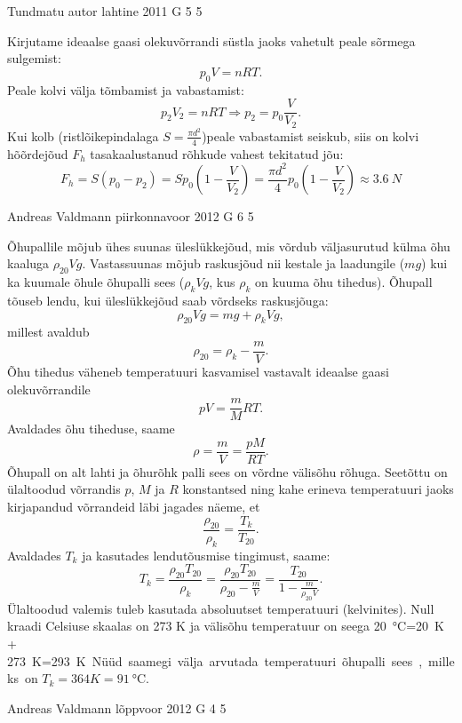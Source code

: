 \documentclass[11pt]{article}
\begin{document}
{%
{Tundmatu autor} %
{lahtine} %
{2011} %
{G 5} %
{5} %
{

\ifSolution
Kirjutame ideaalse gaasi olekuvõrrandi süstla jaoks vahetult peale sõrmega sulgemist:
\[p_{0}V=nRT.\]
Peale kolvi välja tõmbamist ja vabastamist:
\[p_{2}V_{2}=nRT \Rightarrow p_{2}=p_{0}\frac{V}{V_{2}}. \]
Kui kolb (ristlõikepindalaga $S=\frac{\pi d^{2}}{4}$)peale vabastamist seiskub, siis on kolvi hõõrdejõud $F_{h}$ tasakaalustanud rõhkude vahest tekitatud jõu:
\[F_{h}=S(p_{0}-p_{2})=Sp_{0} \left(1-\frac{V}{V_{2}}\right)=\frac{\pi
	d^{2}}{4}p_{0} \left(1-\frac{V}{V_{2}}\right) \approx \SI{3,6}{N} \]
\fi
}

{Andreas Valdmann} %
{piirkonnavoor} %
{2012} %
{G 6} %
{5} %
{

\ifSolution
Õhupallile mõjub ühes suunas üleslükkejõud, mis võrdub väljasurutud külma õhu 
kaaluga $\rho_{20} V g$. Vastassuunas mõjub raskusjõud nii kestale ja laadungile ($mg$) kui ka kuumale õhule õhupalli sees ($\rho_k V g$, kus $\rho_k$ on kuuma õhu tihedus). Õhupall tõuseb lendu, kui üleslükkejõud saab võrdseks raskusjõuga:
\[ \rho_{20} V g=mg+\rho_k V g,\]
millest avaldub
\[ \rho_{20}=\rho_k-\frac{m}{V}.\]
Õhu tihedus väheneb temperatuuri kasvamisel vastavalt ideaalse gaasi olekuvõrrandile
\[ pV=\frac{m}{M}RT. \]
Avaldades õhu tiheduse, saame
\[ \rho=\frac{m}{V}=\frac{pM}{RT}.\]
Õhupall on alt lahti ja õhurõhk palli sees on võrdne välisõhu rõhuga. Seetõttu on ülaltoodud võrrandis $p$, $M$ ja $R$ konstantsed ning kahe erineva temperatuuri jaoks kirjapandud võrrandeid läbi jagades näeme, et
\[ \frac{\rho_{20}}{\rho_k}=\frac{T_k}{T_{20}}.\]
Avaldades $T_k$ ja kasutades lendutõusmise tingimust, saame:
\[ T_k=\frac{\rho_{20} T_{20}}{\rho_k}=\frac{\rho_{20} 
T_{20}}{\rho_{20}-\frac{m}{V}}=\frac{T_{20}}{1-\frac{m}{\rho_{20}V}}.\]
Ülaltoodud valemis tuleb kasutada absoluutset temperatuuri (kelvinites). Null 
kraadi Celsiuse skaalas on 273 K ja välisõhu temperatuur on seega 
\SI{20}{\celsius}=\SI{20}{K} + \SI{273}{K}=\SI{293}K. Nüüd saamegi välja arvutada temperatuuri õhupalli sees, milleks on $T_k=\SI{364}K=\SI{91}\celsius$.
\fi
}

{Andreas Valdmann} %
{lõppvoor} %
{2012} %
{G 4} %
{5} %
{

}}
\end{document}
